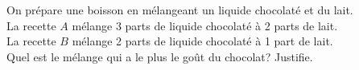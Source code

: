 %
%
On prépare une boisson en mélangeant un liquide chocolaté et du lait. \\
  La recette $A$ mélange 3 parts de liquide chocolaté à 2 parts de lait. \\
  La recette $B$ mélange 2 parts de liquide chocolaté à 1 part de lait. \\
  Quel est le mélange qui a le plus le goût du chocolat? Justifie.
